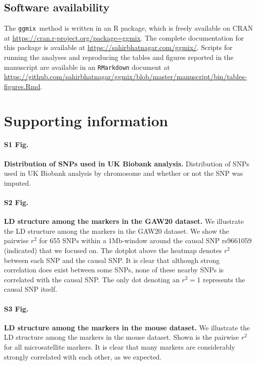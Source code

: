 \documentclass[10pt,letterpaper]{article}
\newcommand{\ggmix}{\texttt{ggmix}}
\begin{document}
\subsection*{Software availability}

The \ggmix ~method is written in an R package, which is freely available on CRAN at \url{https://cran.r-project.org/package=ggmix}. The complete documentation for this package is available at \url{https://sahirbhatnagar.com/ggmix/}. Scripts for running the analyses and reproducing the tables and figures reported in the manuscript are available in an \texttt{RMarkdown} document at \url{https://github.com/sahirbhatnagar/ggmix/blob/master/manuscript/bin/tables-figures.Rmd}.



\section*{Supporting information}



\paragraph*{S1 Fig.}
\label{S1_Fig}
{\bf Distribution of SNPs used in UK Biobank analysis.} Distribution of SNPs used in UK Biobank analysis by chromosome and whether or not the SNP was imputed.

\paragraph*{S2 Fig.}
\label{S2_Fig}
{\bf LD structure among the markers in the GAW20 dataset.} We illustrate the LD structure among the markers in the GAW20 dataset. We show the pairwise $r^2$ for 655 SNPs within a 1Mb-window around the causal SNP rs9661059 (indicated) that we focused on. The dotplot above the heatmap denotes $r^2$ between each SNP and the causal SNP. It is clear that although strong correlation does exist between some SNPs, none of these nearby SNPs is correlated with the causal SNP. The only dot denoting an $r^2=1$ represents the causal SNP itself.

\paragraph*{S3 Fig.}
\label{S3_Fig}
{\bf LD structure among the markers in the mouse dataset.} We illustrate the LD structure among the markers in the mouse dataset. Shown is the pairwise $r^2$ for all microsatellite markers. It is clear that many markers are considerably strongly correlated with each other, as we expected.
\end{document}
